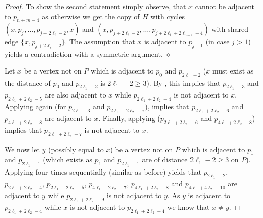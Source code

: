 \documentclass[runningheads,envcountsame]{llncs}
\newenvironment{claimproof}
{\noindent {\em Proof of Claim:} }
{\hfill $\diamond$ \smallskip}
\begin{document}
\begin{proof}
\begin{claimproof}
         To show the second statement simply observe, that $x$ cannot be adjacent to $p_{n+m-4}$ as otherwise we get the copy of $H$ with cycles $(x,p_j,\dots, p_{j+2\ell_i-2},x)$ and $(x,p_{j+2\ell_i-2},\dots, p_{j+2\ell_i+2\ell_{3-i}-4})$ with shared edge $\{x,p_{j+2\ell_i-2}\}$. The assumption that $x$ is adjacent to $p_{j-1}$ (in case $j>1$) yields a contradiction with a symmetric argument.
     \end{claimproof}
     
     Let $x$ be a vertex not on $P$ which is adjacent to $p_0$ and $p_{2\ell_1-2}$ ($x$ must exist as the distance of $p_0$ and $p_{2\ell_1-2}$ is $2\ell_1-2\geq 3$). By , this implies that $p_{2\ell_1-3}$ and $p_{2\ell_1+2\ell_2-5}$ are also adjacent to $x$ while $p_{2\ell_1+2\ell_2-4}$ is not adjacent to $x$. Applying  again (for $p_{2\ell_1-3}$ and $p_{2\ell_1+2\ell_2-5}$), implies that $p_{2\ell_1+2\ell_2-6}$ and $p_{4\ell_1+2\ell_2-8}$ are adjacent to $x$. Finally, applying  ($p_{2\ell_1+2\ell_2-6}$ and $p_{4\ell_1+2\ell_2-8}$) implies that $p_{2\ell_1+2\ell_2-7}$ is not adjacent to $x$.

     We now let $y$ (possibly equal to $x$) be a vertex not on $P$ which is adjacent to $p_{1}$ and $p_{2\ell_1-1}$ (which exists as $p_{1}$ and $p_{2\ell_1-1}$ are of distance $2\ell_1-2\geq 3$ on $P$). Applying  four times sequentially (similar as before) yields that $p_{2\ell_1-2}$, $p_{2\ell_1+2\ell_2-4}$, $p_{2\ell_1+2\ell_2-5}$, $p_{4\ell_1+2\ell_2-7}$, $p_{4\ell_1+2\ell_2-8}$ and $p_{4\ell_1+4\ell_2-10}$ are adjacent to $y$ while $p_{2\ell_1+2\ell_2-9}$ is not adjacent to $y$. As $y$ is adjacent to $p_{2\ell_1+2\ell_2-4}$ while $x$ is not adjacent to $p_{2\ell_1+2\ell_2-4}$ we know that $x\not=y$.


\end{proof}
\end{document}
